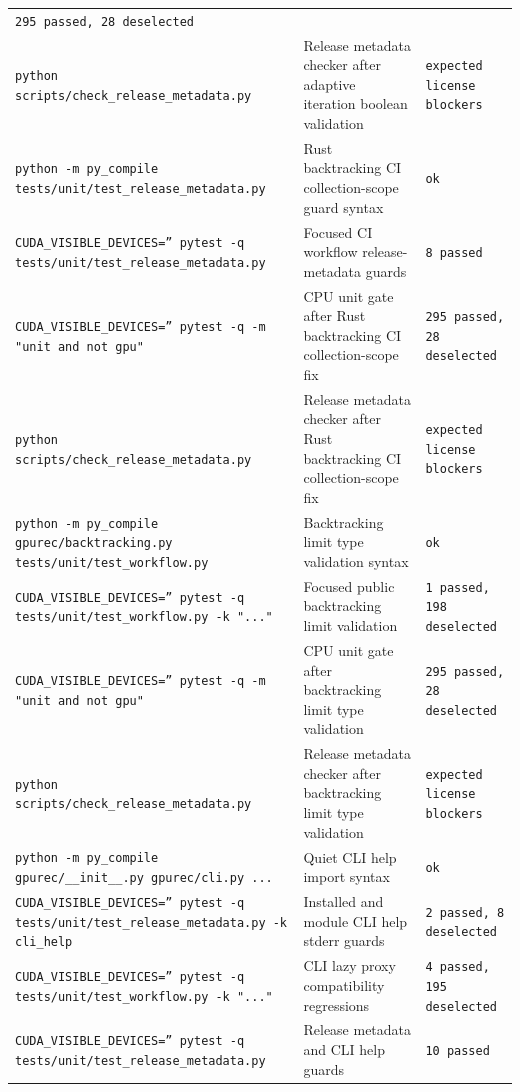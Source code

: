 \documentclass[11pt]{article}
\begin{document}
\begin{center}
\begin{tabular}{lll}
\texttt{295 passed, 28 deselected} \\
\texttt{python scripts/check\_release\_metadata.py} &
Release metadata checker after adaptive iteration boolean validation &
\texttt{expected license blockers} \\
\texttt{python -m py\_compile tests/unit/test\_release\_metadata.py} &
Rust backtracking CI collection-scope guard syntax &
\texttt{ok} \\
\texttt{CUDA\_VISIBLE\_DEVICES='' pytest -q tests/unit/test\_release\_metadata.py} &
Focused CI workflow release-metadata guards &
\texttt{8 passed} \\
\texttt{CUDA\_VISIBLE\_DEVICES='' pytest -q -m "unit and not gpu"} &
CPU unit gate after Rust backtracking CI collection-scope fix &
\texttt{295 passed, 28 deselected} \\
\texttt{python scripts/check\_release\_metadata.py} &
Release metadata checker after Rust backtracking CI collection-scope fix &
\texttt{expected license blockers} \\
\texttt{python -m py\_compile gpurec/backtracking.py tests/unit/test\_workflow.py} &
Backtracking limit type validation syntax &
\texttt{ok} \\
\texttt{CUDA\_VISIBLE\_DEVICES='' pytest -q tests/unit/test\_workflow.py -k "..."} &
Focused public backtracking limit validation &
\texttt{1 passed, 198 deselected} \\
\texttt{CUDA\_VISIBLE\_DEVICES='' pytest -q -m "unit and not gpu"} &
CPU unit gate after backtracking limit type validation &
\texttt{295 passed, 28 deselected} \\
\texttt{python scripts/check\_release\_metadata.py} &
Release metadata checker after backtracking limit type validation &
\texttt{expected license blockers} \\
\texttt{python -m py\_compile gpurec/\_\_init\_\_.py gpurec/cli.py ...} &
Quiet CLI help import syntax &
\texttt{ok} \\
\texttt{CUDA\_VISIBLE\_DEVICES='' pytest -q tests/unit/test\_release\_metadata.py -k cli\_help} &
Installed and module CLI help stderr guards &
\texttt{2 passed, 8 deselected} \\
\texttt{CUDA\_VISIBLE\_DEVICES='' pytest -q tests/unit/test\_workflow.py -k "..."} &
CLI lazy proxy compatibility regressions &
\texttt{4 passed, 195 deselected} \\
\texttt{CUDA\_VISIBLE\_DEVICES='' pytest -q tests/unit/test\_release\_metadata.py} &
Release metadata and CLI help guards &
\texttt{10 passed} \\

\end{tabular}
\end{center}
\end{document}
